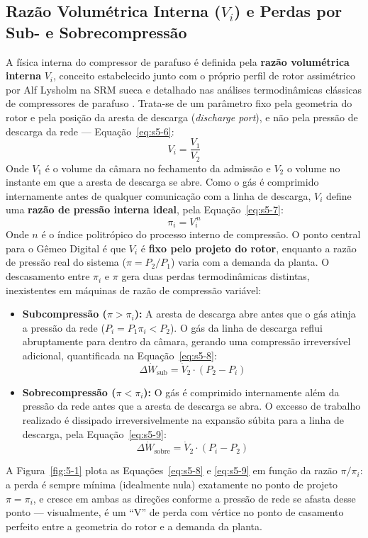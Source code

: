 \documentclass[12pt,a4paper]{article}
\numberwithin{equation}{section}
\numberwithin{table}{section}
\numberwithin{figure}{section}
\begin{document}
	\subsection{\textbf{Razão Volumétrica Interna (\texorpdfstring{$V_i$}{Vi}) e Perdas por Sub- e Sobrecompressão}}
	A física interna do compressor de parafuso é definida pela \textbf{razão volumétrica interna} $V_i$, conceito estabelecido junto com o próprio perfil de rotor assimétrico por Alf Lysholm na SRM sueca \cite{lysholm} e detalhado nas análises termodinâmicas clássicas de compressores de parafuso \cite{fleming}. Trata-se de um parâmetro fixo pela geometria do rotor e pela posição da aresta de descarga (\textit{discharge port}), e não pela pressão de descarga da rede — Equação~\eqref{eq:s5-6}:
	\begin{equation}\label{eq:s5-6}
 V_i = \frac{V_1}{V_2} 
\end{equation}
	Onde $V_1$ é o volume da câmara no fechamento da admissão e $V_2$ o volume no instante em que a aresta de descarga se abre. Como o gás é comprimido internamente antes de qualquer comunicação com a linha de descarga, $V_i$ define uma \textbf{razão de pressão interna ideal}, pela Equação~\eqref{eq:s5-7}:
	\begin{equation}\label{eq:s5-7}
 \pi_i = V_i^{\,n} 
\end{equation}
	Onde $n$ é o índice politrópico do processo interno de compressão. O ponto central para o Gêmeo Digital é que $V_i$ é \textbf{fixo pelo projeto do rotor}, enquanto a razão de pressão real do sistema ($\pi = P_2/P_1$) varia com a demanda da planta. O descasamento entre $\pi_i$ e $\pi$ gera duas perdas termodinâmicas distintas, inexistentes em máquinas de razão de compressão variável:
	\begin{itemize}
		\item \textbf{Subcompressão ($\pi > \pi_i$):} A aresta de descarga abre antes que o gás atinja a pressão da rede ($P_i = P_1 \pi_i < P_2$). O gás da linha de descarga reflui abruptamente para dentro da câmara, gerando uma compressão irreversível adicional, quantificada na Equação~\eqref{eq:s5-8}:
		\begin{equation}\label{eq:s5-8}
 \Delta \dot{W}_{\text{sub}} = \dot{V}_2 \cdot (P_2 - P_i) 
\end{equation}
		\item \textbf{Sobrecompressão ($\pi < \pi_i$):} O gás é comprimido internamente além da pressão da rede antes que a aresta de descarga se abra. O excesso de trabalho realizado é dissipado irreversivelmente na expansão súbita para a linha de descarga, pela Equação~\eqref{eq:s5-9}:
		\begin{equation}\label{eq:s5-9}
 \Delta \dot{W}_{\text{sobre}} = \dot{V}_2 \cdot (P_i - P_2) 
\end{equation}
	\end{itemize}
	A Figura~\ref{fig:5-1} plota as Equações~\eqref{eq:s5-8} e \eqref{eq:s5-9} em função da razão $\pi/\pi_i$: a perda é sempre mínima (idealmente nula) exatamente no ponto de projeto $\pi=\pi_i$, e cresce em ambas as direções conforme a pressão de rede se afasta desse ponto — visualmente, é um ``V'' de perda com vértice no ponto de casamento perfeito entre a geometria do rotor e a demanda da planta.
\end{document}
